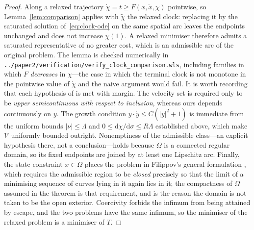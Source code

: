 \documentclass[12pt]{iopart}
\newcommand{\dd}{\mathrm{d}}
\theoremstyle{plain}
\theoremstyle{definition}
\theoremstyle{plain}
\theoremstyle{remark}
\begin{document}
\begin{proof}
Along a relaxed trajectory $\dot\chi=t\ge F(x,\dot x,\chi)$ pointwise, so
Lemma~\ref{lem:comparison} applies with $\tilde\chi$ the relaxed clock: replacing it
by the saturated solution of~\eqref{eq:clock-ode} on the same spatial arc leaves the
endpoints unchanged and does not increase $\chi(1)$. A relaxed minimiser therefore
admits a saturated representative of no greater cost, which is an admissible arc of
the original problem. The lemma is checked numerically in
\texttt{../paper2/verification/verify\_clock\_comparison.wls}, including families in
which $F$ \emph{decreases} in $\chi$---the case in which the terminal clock is not
monotone in the pointwise value of $\dot\chi$ and the naive argument would fail. It is worth
recording that each hypothesis of \cite[Thm.~1]{Filippov1962} is met with margin. The
velocity set is required only to be \emph{upper semicontinuous with respect to
inclusion}, whereas ours depends continuously on $y$. The growth condition
$y\cdot\dot y\le C(|y|^2+1)$ is immediate from the uniform bounds
$|\nu|\le\Lambda$ and $0\le\dd\chi/\dd\sigma\le R\Lambda$ established above, which make
$\mathcal V$ uniformly bounded outright. Nonemptiness of the admissible class---an
explicit hypothesis there, not a conclusion---holds because $\Omega$ is a connected
regular domain, so its fixed endpoints are joined by at least one Lipschitz arc.
Finally, the state constraint $x\in\Omega$ places the problem in Filippov's general
formulation \cite[\S IV]{Filippov1962}, which requires the admissible region to be
\emph{closed} precisely so that the limit of a minimising sequence of curves lying in
it again lies in it; the compactness of $\Omega$ assumed in the theorem is that
requirement, and is the reason the domain is not taken to be the open exterior. Coercivity forbids the infimum from being attained by escape, and the two
problems have the same infimum, so the minimiser of the relaxed problem is a
minimiser of $T$.


\end{proof}
\end{document}
